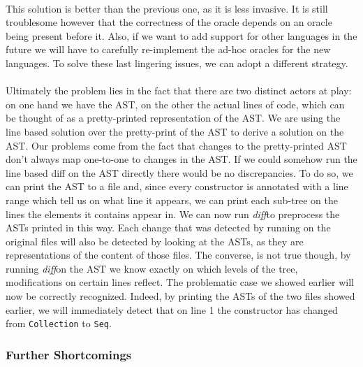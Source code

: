 \documentclass[11pt, titlepage]{article}
\newcommand{\toHaskell}[1]{\texttt{#1}\xspace}
\newcommand{\diff}{\emph{diff}}
\begin{document}
\\
This solution is better than the previous one, as it is less invasive. It is still troublesome however that the correctness of the oracle depends on an oracle being present before it. Also, if we want to add support for other languages in the future we will have to carefully re-implement the ad-hoc oracles for the new languages. To solve these last lingering issues, we can adopt a different strategy. 
\\
\\
Ultimately the problem lies in the fact that there are two distinct actors at play: on one hand we have the AST, on the other the actual lines of code, which can be thought of as a pretty-printed representation of the AST. We are using the line based solution over the pretty-print of the AST to derive a solution on the AST. Our problems come from the fact that changes to the pretty-printed AST don't always map one-to-one to changes in the AST. If we could somehow run the line based diff on the AST directly there would be no discrepancies. To do so, we can print the AST to a file and, since every constructor is annotated with a line range which tell us on what line it appears, we can print each sub-tree on the lines the elements it contains appear in. 
We can now run \diff to preprocess the ASTs printed in this way. Each change that was detected by running on the original files will also be detected by looking at the ASTs, as they are representations of the content of those files. The converse, is not true though, by running \diff on the AST we know exactly on which levels of the tree, modifications on certain lines reflect.
The problematic case we showed earlier will now be correctly recognized. Indeed, by printing the ASTs of the two files showed earlier, we will immediately detect that on line 1 the constructor has changed from \toHaskell{Collection} to \toHaskell{Seq}.

\subsubsection{Further Shortcomings}
\end{document}
